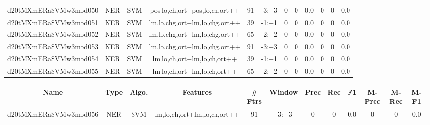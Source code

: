 \documentclass[a4paper]{article}
\begin{document}
\begin{landscape}
\begin{center}
\begin{tabular}{ |c|c|c|c|c|c|c|c|c|c|c|c|}
 
 	
 	\small{ d20tMXmERaSVMw3mod050 } & \small{ NER} & \small{  SVM }  & pos,lo,ch,ort+pos,lo,ch,ort++  &  91 &  \small{  -3:+3 }  &  0 & 0 & 0.0  &  0 & 0 & 0.0 \\
 	

 
 	
 	\small{ d20tMXmERaSVMw3mod051 } & \small{ NER} & \small{  SVM }  & lm,lo,chg,ort+lm,lo,chg,ort++  &  39 &  \small{  -1:+1 }  &  0 & 0 & 0.0  &  0 & 0 & 0.0 \\
 	

 
 	
 	\small{ d20tMXmERaSVMw3mod052 } & \small{ NER} & \small{  SVM }  & lm,lo,chg,ort+lm,lo,chg,ort++  &  65 &  \small{  -2:+2 }  &  0 & 0 & 0.0  &  0 & 0 & 0.0 \\
 	

 
 	
 	\small{ d20tMXmERaSVMw3mod053 } & \small{ NER} & \small{  SVM }  & lm,lo,chg,ort+lm,lo,chg,ort++  &  91 &  \small{  -3:+3 }  &  0 & 0 & 0.0  &  0 & 0 & 0.0 \\
 	

 
 	
 	\small{ d20tMXmERaSVMw3mod054 } & \small{ NER} & \small{  SVM }  & lm,lo,ch,ort+lm,lo,ch,ort++  &  39 &  \small{  -1:+1 }  &  0 & 0 & 0.0  &  0 & 0 & 0.0 \\
 	

 
 	
 	\small{ d20tMXmERaSVMw3mod055 } & \small{ NER} & \small{  SVM }  & lm,lo,ch,ort+lm,lo,ch,ort++  &  65 &  \small{  -2:+2 }  &  0 & 0 & 0.0  &  0 & 0 & 0.0 \\
 	
 \hline
\end{tabular}
\end{center}




\begin{center}
\begin{tabular}{ |c|c|c|c|c|c|c|c|c|c|c|c|} 
 \hline
 	Name & Type & Algo. & Features & \# Ftrs & Window & Prec & Rec & F1 & M-Prec & M-Rec & M-F1\\
 \hline

 	

 
 	
 	\small{ d20tMXmERaSVMw3mod056 } & \small{ NER} & \small{  SVM }  & lm,lo,ch,ort+lm,lo,ch,ort++  &  91 &  \small{  -3:+3 }  &  0 & 0 & 0.0  &  0 & 0 & 0.0 \\
 	

 
 	

\end{tabular}
\end{center}
\end{landscape}
\end{document}
